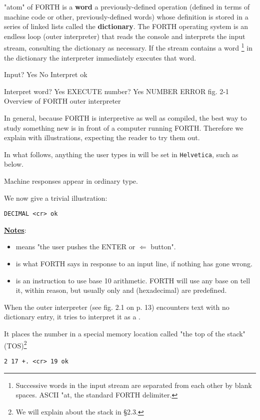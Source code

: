  "atom" of FORTH is a \textbf{word} a previously-defined operation (defined in terms of machine code or other, previously-defined words) whose definition is stored in a series of linked lists called the \textbf{dictionary}. The FORTH operating system is an endless loop (outer interpreter) that reads the console and interprets the input stream, consulting the dictionary as necessary. If the stream contains a word \footnote{Successive words in the input stream are separated from each other by blank spaces. ASCII "at, the standard FORTH delimiter.} in the dictionary the interpreter immediately executes that word.

Input? Yes
No Interpret
ok

Interpret
word? Yes EXECUTE
number? Yes NUMBER
ERROR
fig. 2-1 Overview of FORTH outer interpreter

In general, because FORTH is interpretive as well as compiled, the best way to study something new is in front of a computer running FORTH. Therefore we explain with illustrations, expecting the reader to try them out.

In what follows, anything the user types in will be set in \lstinline$Helvetica$, such as  below.

Machine responses appear in ordinary type.

We now give a trivial illustration:

\begin{lstlisting}
DECIMAL <cr> ok
\end{lstlisting}

\underline{\textbf{Notes}}:
\begin{itemize}
  \item {} means "the user pushes the ENTER or $\Leftarrow$ button".
  \item {} is what FORTH says in response to an input line, if nothing has gone wrong.
  \item {} is an instruction to use base 10 arithmetic. FORTH will use any base on tell it, within reason, but usually only  and  (hexadecimal) are predefined.
\end{itemize}

When the outer interpreter (see fig. 2.1 on p. 13) encounters text with no dictionary entry, it tries to interpret it as a .

It places the number in a special memory location called "the top of the stack" (TOS)\footnote{We will explain about the stack in §2.3.}
\begin{lstlisting}
2 17 +. <cr> 19 ok
\end{lstlisting}

